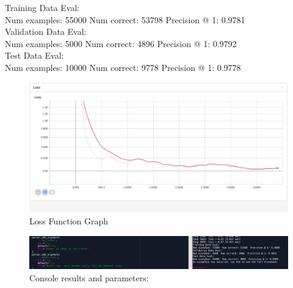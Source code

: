\documentclass[12pt]{article}
\begin{document}
Training Data Eval:\\
Num examples: 55000  Num correct: 53798  Precision @ 1: 0.9781\\
Validation Data Eval:\\
Num examples: 5000  Num correct: 4896  Precision @ 1: 0.9792\\
Test Data Eval:\\
Num examples: 10000  Num correct: 9778  Precision @ 1: 0.9778\\





\begin{figure}[H]
\caption{Loss Function Graph}
\centering
  \includegraphics[width=\linewidth]{Loss.png}
\end{figure}


\begin{figure}[H]
\caption{Console results and parameters:}
\centering
  \includegraphics[width=\linewidth]{spyder-console.png}
\end{figure}
\end{document}
